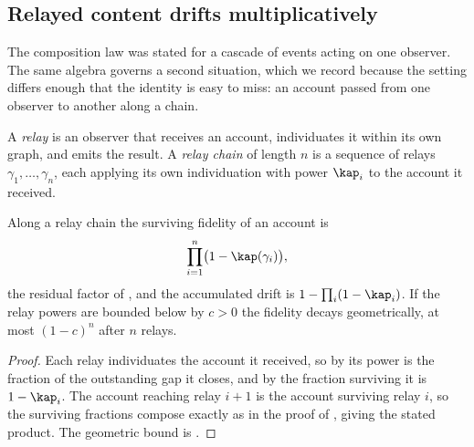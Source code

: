 
\subsection{Relayed content drifts multiplicatively}
\label{sec:relay}

The composition law was stated for a cascade of events acting on one
observer. The same algebra governs a second situation, which we record
because the setting differs enough that the identity is easy to miss: an
account passed from one observer to another along a chain.

\begin{definition}
\label{def:relay}
A \emph{relay} is an observer that receives an account, individuates it
within its own graph, and emits the result. A \emph{relay chain} of length
$n$ is a sequence of relays $\gamma_1,\dots,\gamma_n$, each applying its own
individuation with power $\kap_i$ to the account it received.
\end{definition}

\begin{corollary}
\label{cor:relay-drift}
Along a relay chain the surviving fidelity of an account is
\[
\prod_{i=1}^{n}\bigl(1-\kap(\gamma_i)\bigr),
\]
the residual factor of , and the accumulated drift is
$1-\prod_i(1-\kap_i)$. If the relay powers are bounded below by $c>0$ the
fidelity decays geometrically, at most $(1-c)^{n}$ after $n$ relays.
\end{corollary}

\begin{proof}
Each relay individuates the account it received, so by  its
power is the fraction of the outstanding gap it closes, and by
 the fraction surviving it is $1-\kap_i$. The account
reaching relay $i+1$ is the account surviving relay $i$, so the surviving
fractions compose exactly as in the proof of , giving
the stated product. The geometric bound is .
\end{proof}

